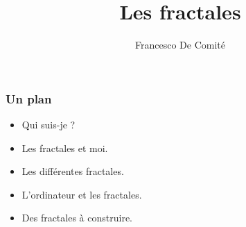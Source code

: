 \documentclass{beamer}
\title[Les fractales]{Les fractales}
\author{Francesco De Comité}\institute{Université de Lille \\ Faculté des Sciences et Technologies}
\begin{document}
 \begin{frame}
\titlepage
{}
   \end{frame}

  
 \begin{frame}\frametitle{Un plan}

\begin{itemize}
\item Qui suis-je ? 
\item Les fractales et moi. 
\item Les différentes fractales. 
\item L'ordinateur et les fractales. 
\item Des fractales à construire. 
\end{itemize}

   \end{frame}
\end{document}
